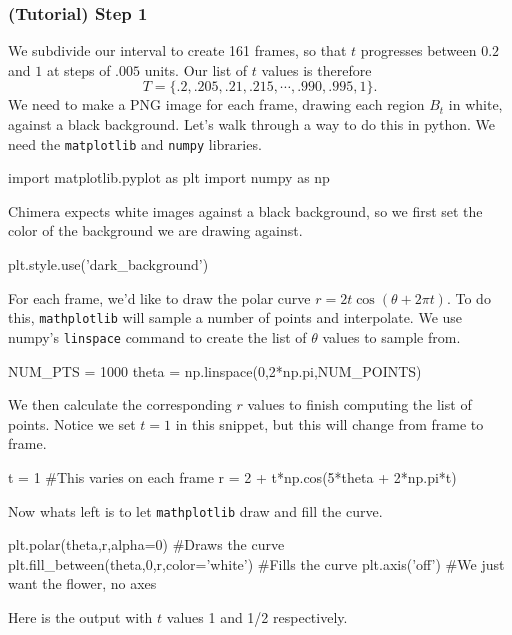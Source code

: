 \documentclass[12 pt]{article}
\begin{document}
\subsubsection*{(Tutorial) Step 1}
We subdivide our interval to create 161 frames, so that $t$ progresses between $0.2$ and $1$ at steps of $.005$ units.  Our list of $t$ values is therefore
\[T = \{.2, .205, .21, .215,\cdots,.990,.995,1\}.\]
We need to make a PNG image for each frame, drawing each region $B_t$ in white, against a black background.  Let's walk through a way to do this in python.  We need the \verb|matplotlib| and \verb|numpy| libraries.
\begin{python}
  import matplotlib.pyplot as plt
  import numpy as np
\end{python}
Chimera expects white images against a black background, so we first set the color of the background we are drawing against.
\begin{python}
  plt.style.use('dark_background')
\end{python}
For each frame, we'd like to draw the polar curve $r = 2t\cos(\theta+2\pi t)$.  To do this, \verb|mathplotlib| will sample a number of points and interpolate.  We use numpy's \verb|linspace| command to create the list of $\theta$ values to sample from.
\begin{python}
  NUM_PTS = 1000
  theta = np.linspace(0,2*np.pi,NUM_POINTS)
\end{python}
We then calculate the corresponding $r$ values to finish computing the list of points.  Notice we set $t=1$ in this snippet, but this will change from frame to frame.
\begin{python}
  t = 1 #This varies on each frame
  r = 2 + t*np.cos(5*theta + 2*np.pi*t)
\end{python}
Now whats left is to let \verb|mathplotlib| draw and fill the curve.
\begin{python}
  plt.polar(theta,r,alpha=0) #Draws the curve
  plt.fill_between(theta,0,r,color='white') #Fills the curve
  plt.axis('off') #We just want the flower, no axes
\end{python}
Here is the output with $t$ values 1 and 1/2 respectively.\\
\end{document}
